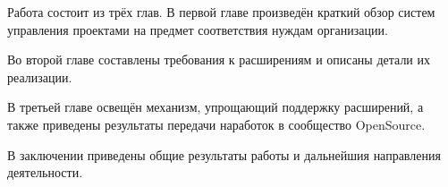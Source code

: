 Работа состоит из трёх глав. В первой главе произведён краткий обзор систем управления проектами на предмет соответствия нуждам организации. 

Во второй главе составлены требования к расширениям и описаны детали их реализации. 

В третьей главе освещён механизм, упрощающий поддержку расширений, а также приведены результаты передачи наработок в сообщество OpenSource. 

В заключении приведены общие результаты работы и дальнейшия направления деятельности.



